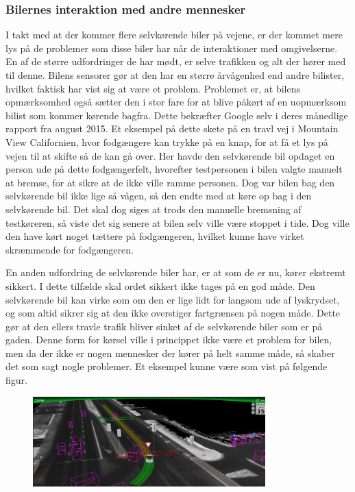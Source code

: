 \subsubsection{Bilernes interaktion med andre mennesker}
\label{interaktion}
I takt med at der kommer flere selvkørende biler på vejene, er der kommet mere lys på de problemer som disse biler har når de interaktioner med omgivelserne. En af de større udfordringer de har mødt, er selve trafikken og alt der hører med til denne. Bilens sensorer gør at den har en større årvågenhed end andre bilister, hvilket faktisk har vist sig at være et problem. Problemet er, at bilens opmærksomhed også sætter den i stor fare for at blive påkørt af en uopmærksom bilist som kommer kørende bagfra. Dette bekræfter Google selv i deres månedlige rapport fra august 2015\cite{GOOG_MONTHLY}. Et eksempel på dette skete på en travl vej i Mountain View Californien, hvor fodgængere kan trykke på en knap, for at få et lys på vejen til at skifte så de kan gå over. Her havde den selvkørende bil opdaget en person ude på dette fodgængerfelt, hvorefter testpersonen i bilen valgte manuelt at bremse, for at sikre at de ikke ville ramme personen. Dog var bilen bag den selvkørende bil ikke lige så vågen, så den endte med at køre op bag i den selvkørende bil. Det skal dog siges at trods den manuelle bremsning af testkøreren, så viste det sig senere at bilen selv ville være stoppet i tide. Dog ville den have kørt noget tættere på fodgængeren, hvilket kunne have virket skræmmende for fodgængeren\cite{GOOG_MONTHLY}. 

En anden udfordring de selvkørende biler har, er at som de er nu, kører ekstremt sikkert. I dette tilfælde skal ordet sikkert ikke tages på en god måde. Den selvkørende bil kan virke som om den er lige lidt for langsom ude af lyskrydset, og som altid sikrer sig at den ikke overstiger fartgrænsen på nogen måde. Dette gør at den ellers travle trafik bliver sinket af de selvkørende biler som er på gaden. Denne form for kørsel ville i princippet ikke være et problem for bilen, men da der ikke er nogen mennesker der kører på helt samme måde, så skaber det som sagt nogle problemer. Et eksempel kunne være som vist på følgende figur.

\begin{figure}[h!]
    \centering
    \includegraphics[width=0.8\textwidth]{images/google_vision.png}
    \label{fig:car_vision}
\end{figure}

